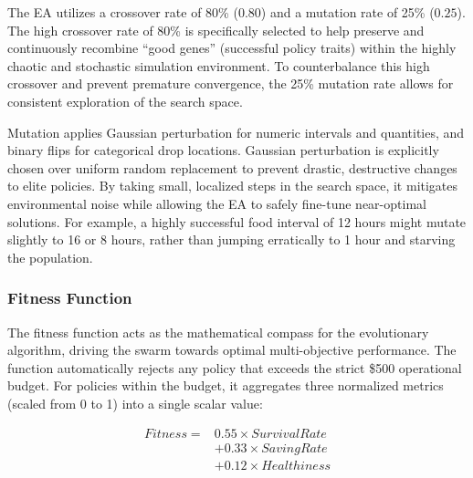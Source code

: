 \documentclass[conference]{IEEEtran}
\begin{document}
The EA utilizes a crossover rate of 80\% ($0.80$) and a mutation rate of 25\% ($0.25$). The high crossover rate of 80\% is specifically selected to help preserve and continuously recombine ``good genes'' (successful policy traits) within the highly chaotic and stochastic simulation environment. To counterbalance this high crossover and prevent premature convergence, the 25\% mutation rate allows for consistent exploration of the search space.

Mutation applies Gaussian perturbation for numeric intervals and quantities, and binary flips for categorical drop locations. Gaussian perturbation is explicitly chosen over uniform random replacement to prevent drastic, destructive changes to elite policies. By taking small, localized steps in the search space, it mitigates environmental noise while allowing the EA to safely fine-tune near-optimal solutions. For example, a highly successful food interval of 12 hours might mutate slightly to 16 or 8 hours, rather than jumping erratically to 1 hour and starving the population.

\subsubsection{Fitness Function}
The fitness function acts as the mathematical compass for the evolutionary algorithm, driving the swarm towards optimal multi-objective performance. The function automatically rejects any policy that exceeds the strict \$500 operational budget. For policies within the budget, it aggregates three normalized metrics (scaled from 0 to 1) into a single scalar value:

\begin{equation}
\boxed{
\begin{aligned}
Fitness ={} & 0.55 \times SurvivalRate \\
            & + 0.33 \times SavingRate \\
            & + 0.12 \times Healthiness
\end{aligned}
}
\end{equation}
\end{document}
